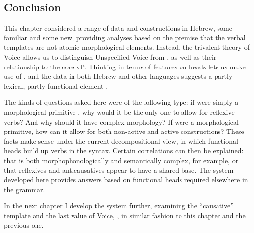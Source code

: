	\subsection{Conclusion} \label{vz:others:conc}
This chapter considered a range of data and constructions in Hebrew, some familiar and some new, providing analyses based on the premise that the verbal templates are not atomic morphological elements. Instead, the trivalent theory of Voice allows us to distinguish Unspecified Voice from {\vz}, as well as their relationship to the core vP. Thinking in terms of features on heads lets us make use of {\pz}, and the data in both Hebrew and other languages suggests a partly lexical, partly functional element {\va}.

The kinds of questions asked here were of the following type: if {\thit} were simply a morphological primitive \citep{reinhartsiloni05}, why would it be the only one to allow for reflexive verbs? And why should it have complex morphology? If {\tnif} were a morphological primitive, how can it allow for both non-active and active constructions? These facts make sense under the current decompositional view, in which functional heads build up verbs in the syntax. Certain correlations can then be explained: that {\thit} is both morphophonologically and semantically complex, for example, or that reflexives and anticausatives appear to have a shared base. The system developed here provides answers based on functional heads required elsewhere in the grammar.

In the next chapter I develop the system further, examining the ``causative'' template {\thif} and the last value of Voice, {\vd}, in similar fashion to this chapter and the previous one.





